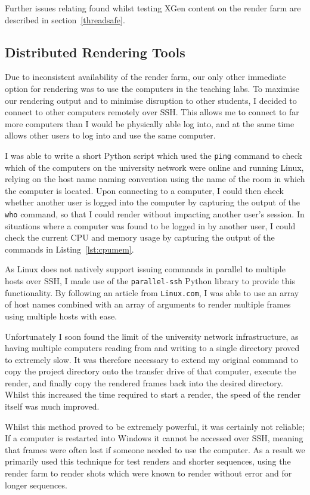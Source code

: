 \documentclass[11pt]{article}
\begin{document}
Further issues relating found whilst testing XGen content on the render farm are described in section~\ref{threadsafe}.

\subsection{Distributed Rendering Tools}

Due to inconsistent availability of the render farm, our only other immediate option for rendering was to use the computers in the teaching labs. To maximise our rendering output and to minimise disruption to other students, I decided to connect to other computers remotely over SSH. This allows me to connect to far more computers than I would be physically able log into, and at the same time allows other users to log into and use the same computer.

I was able to write a short Python script which used the \texttt{ping} command to check which of the computers on the university network were online and running Linux, relying on the host name naming convention using the name of the room in which the computer is located. Upon connecting to a computer, I could then check whether another user is logged into the computer by capturing the output of the \texttt{who} command, so that I could render without impacting another user's session. In situations where a computer was found to be logged in by another user, I could check the current CPU and memory usage by capturing the output of the commands in Listing~\ref{lst:cpumem}.

As Linux does not natively support issuing commands in parallel to multiple hosts over SSH, I made use of the \texttt{parallel-ssh}\cite{pssh} Python library to provide this functionality. By following an article from \texttt{Linux.com}\cite{martin_2008}, I was able to use an array of host names combined with an array of arguments to render multiple frames using multiple hosts with ease.

Unfortunately I soon found the limit of the university network infrastructure, as having multiple computers reading from and writing to a single directory proved to extremely slow. It was therefore necessary to extend my original command to copy the project directory onto the transfer drive of that computer, execute the render, and finally copy the rendered frames back into the desired directory. Whilst this increased the time required to start a render, the speed of the render itself was much improved.

Whilst this method proved to be extremely powerful, it was certainly not reliable; If a computer is restarted into Windows it cannot be accessed over SSH, meaning that frames were often lost if someone needed to use the computer. As a result we primarily used this technique for test renders and shorter sequences, using the render farm to render shots which were known to render without error and for longer sequences.
\end{document}
